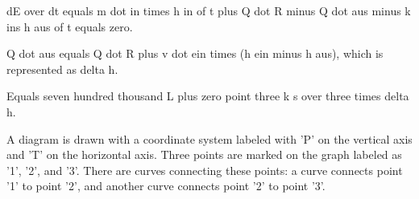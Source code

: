 dE over dt equals m dot in times h in of t plus Q dot R minus Q dot aus minus k ins h aus of t equals zero.

Q dot aus equals Q dot R plus v dot ein times (h ein minus h aus), which is represented as delta h.

Equals seven hundred thousand L plus zero point three k s over three times delta h.

A diagram is drawn with a coordinate system labeled with 'P' on the vertical axis and 'T' on the horizontal axis. Three points are marked on the graph labeled as '1', '2', and '3'. There are curves connecting these points: a curve connects point '1' to point '2', and another curve connects point '2' to point '3'.